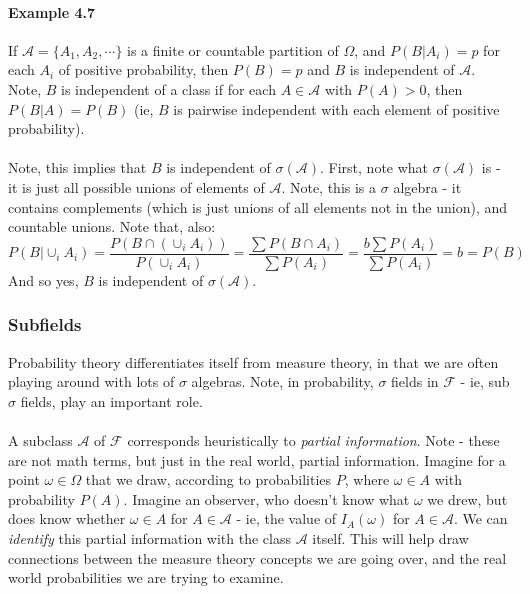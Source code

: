 \documentclass[12pt,a4paper]{article}
\newcommand{\1}[1]{\mathbbm{1}\left\{ #1 \right\}}
\newcommand{\acal}{\mathcal{A}}
\newcommand{\fcal}{\mathcal{F}}
\begin{document}
\paragraph{Example 4.7} If $\acal = \{A_1, A_2, \cdots\}$ is a finite or countable partition of $\Omega$, and $P(B|A_i) = p$ for each $A_i$ of positive probability, then $P(B) = p$ and $B$ is independent of $\acal$. Note, $B$ is independent of a class if for each $A \in \acal$ with $P(A) > 0$, then $P(B|A) = P(B)$ (ie, $B$ is pairwise independent with each element of positive probability).
\\\\
Note, this implies that $B$ is independent of $\sigma(\acal)$. First, note what $\sigma(\acal)$ is - it is just all possible unions of elements of $\acal$. Note, this is a $\sigma$ algebra - it contains complements (which is just unions of all elements not in the union), and countable unions. Note that, also:
$$
	P(B | \cup_i A_i) = \frac{P(B \cap (\cup_i A_i))}{P(\cup_i A_i)} = \frac{\sum P(B \cap A_i)}{\sum P(A_i)} =
	\frac{b \sum P(A_i)}{\sum P(A_i)} = b = P(B)
$$
And so yes, $B$ is independent of $\sigma(\acal)$. 

\subsubsection{Subfields}
Probability theory differentiates itself from measure theory, in that we are often playing around with lots of $\sigma$ algebras. Note, in probability, $\sigma$ fields in $\fcal$ - ie, sub $\sigma$ fields, play an important role.
\\\\
A subclass $\acal$ of $\fcal$ corresponds heuristically to \textit{partial information}. Note - these are not math terms, but just in the real world, partial information. Imagine for a point $\omega \in \Omega$ that we draw, according to probabilities $P$, where $\omega \in A$ with probability $P(A)$. Imagine an observer, who doesn't know what $\omega$ we drew, but does know whether $\omega \in A$ for $A \in \acal$ - ie, the value of $I_A(\omega)$ for $A \in \acal$. We can \textit{identify} this partial information with the class $\acal$ itself. This will help draw connections between the measure theory concepts we are going over, and the real world probabilities we are trying to examine.
\end{document}
